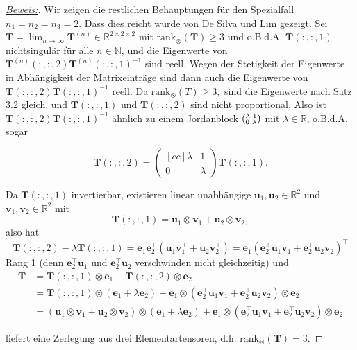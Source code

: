 \documentclass[11pt]{article} %
\theoremstyle{definition}
\numberwithin{equation}{section}
\begin{document}
\begin{changemargin}{0pt}{0pt}
\begin{proof}[\underline{Beweis:}\nopunct]
Wir zeigen die restlichen Behauptungen für den Spezialfall $n_{1} = n_{2} = n_{3} = 2.$ Dass dies reicht wurde von De Silva und Lim gezeigt.
Sei $\mathbf{T} = \lim_{n\rightarrow\infty} \mathbf{T}^{(n)} \in \mathbb{R}^{2\times 2\times 2}$ mit $ \text{rank}_{\otimes}(\mathbf{T})\geq 3$ und
o.B.d.A. $\mathbf{T}(:,:,1)$ nichtsingulär für alle $n \in \mathbb{N}$, und die Eigenwerte von $\mathbf{T}^{(n)}(:,:,2)\mathbf{T}^{(n)}(:,:,1)^{-1}$ sind
reell. Wegen der Stetigkeit der Eigenwerte in Abhängigkeit der Matrixeinträge sind dann auch die Eigenwerte von 
$\mathbf{T}(:,:,2)\mathbf{T}(:,:,1)^{-1}$ reell. Da $\text{rank}_{\otimes}(T)\geq 3,$ sind die Eigenwerte nach Satz 3.2 gleich, und $\mathbf{T}(:,:,1)$ 
und $\mathbf{T}(:,:,2)$ sind nicht proportional. Also ist $\mathbf{T}(:,:,2)\mathbf{T}(:,:,1)^{-1}$ ähnlich zu einem Jordanblock 
$(^{\lambda \hspace{1mm} 1}_{0 \hspace{1mm} \lambda})$ mit $\lambda \in \mathbb{R}$, o.B.d.A. sogar

\[ \mathbf{T}(:,:,2) = \begin{pmatrix}[cc] \lambda & 1 \\ 0 & \lambda \end{pmatrix} \mathbf{T}(:,:,1).\]

Da $\mathbf{T}(:,:,1)$ invertierbar, existieren linear unabhängige $\mathbf{u}_{1},\mathbf{u}_{2} \in \mathbb{R}^{2}$ und $\mathbf{v}_{1},
\mathbf{v}_{2} \in \mathbb{R}^{2}$ mit
\[ \mathbf{T}(:,:,1) = \mathbf{u}_{1}\otimes\mathbf{v}_{1}+\mathbf{u}_{2}\otimes\mathbf{v}_{2},\]
also hat
\[ \mathbf{T}(:,:,2) - \lambda\mathbf{T}(:,:,1) = \mathbf{e}_{1}\mathbf{e}_{2}^{\top}(\mathbf{u}_{1}\mathbf{v}_{1}^{\top} 
+ \mathbf{u}_{2}\mathbf{v}_{2}^{\top}) = \mathbf{e}_{1}(\mathbf{e}_{2}^{\top}\mathbf{u}_{1}\mathbf{v}_{1}
+ \mathbf{e}_{2}^{\top}\mathbf{u}_{2}\mathbf{v}_{2})^{\top} \]
Rang 1 (denn $\mathbf{e}_{2}^{\top}\mathbf{u}_{1}$ und $\mathbf{e}_{2}^{\top}\mathbf{u}_{2}$ verschwinden nicht gleichzeitig) und
\begin{align*} \mathbf{T} &= \mathbf{T}(:,:,1)\otimes \mathbf{e}_{1} + \mathbf{T}(:,:,2)\otimes \mathbf{e}_{2}\\
&= \mathbf{T}(:,:,1)\otimes(\mathbf{e}_{1}+\lambda\mathbf{e}_2) + \mathbf{e}_1\otimes(\mathbf{e}_{2}^{\top}\mathbf{u}_{1}\mathbf{v}_{1}
+ \mathbf{e}_{2}^{\top}\mathbf{u}_{2}\mathbf{v}_{2})\otimes \mathbf{e}_{2}\\
&= (\mathbf{u}_{1}\otimes \mathbf{v}_{1} + \mathbf{u}_{2}\otimes\mathbf{v}_{2})\otimes(\mathbf{e}_{1}+\lambda\mathbf{e}_{2})
+ \mathbf{e}_{1}\otimes(\mathbf{e}_{2}^{\top}\mathbf{u}_{1}\mathbf{v}_{1} + \mathbf{e}_{2}^{\top}\mathbf{u}_{2}\mathbf{v}_{2})\otimes
\mathbf{e}_{2}
\end{align*}

liefert eine Zerlegung aus drei Elementartensoren, d.h. $\text{rank}_{\otimes}(\mathbf{T}) = 3.$
\end{proof}

\end{changemargin}
\end{document}
